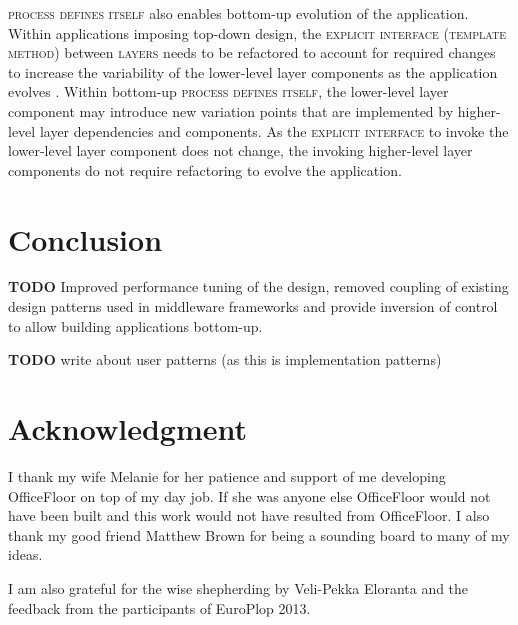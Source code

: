 \documentclass[prodmode]{style/acmlarge}
\begin{document}
\textsc{process defines itself} also enables bottom-up evolution of the
application.  Within applications imposing top-down design, the
\textsc{explicit interface} (\textsc{template method}) between \textsc{layers}
needs to be refactored to account for required changes to increase the
variability of the lower-level layer components as the application evolves
\cite{ioc}.  Within bottom-up \textsc{process defines itself}, the lower-level
layer component may introduce new variation points that are implemented by
higher-level layer dependencies and components.  As the \textsc{explicit
interface} to invoke the lower-level layer component does not change, the
invoking higher-level layer components do not require refactoring to evolve the
application.




\section{Conclusion}

\textbf{TODO} Improved performance tuning of the design, removed coupling of
existing design patterns used in middleware frameworks and provide inversion of
control to allow building applications bottom-up.

\textbf{TODO} write about user patterns (as this is implementation patterns)



\section*{Acknowledgment} 

I thank my wife Melanie for her patience and support
of me developing OfficeFloor on top of my day job.  If she was anyone else
OfficeFloor would not have been built and this work would not have resulted from
OfficeFloor.  I also thank my good friend Matthew Brown for being a sounding
board to many of my ideas.

I am also grateful for the wise shepherding by Veli-Pekka Eloranta and the
feedback from the participants of EuroPlop 2013.




\end{document}
